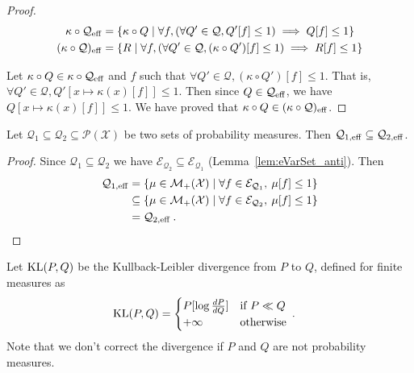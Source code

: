 \begin{proof}
  \begin{align*}
    \kappa \circ \mathcal{Q}_{\operatorname{eff}}
    &= \{\kappa \circ Q \mid \forall f, (\forall Q' \in \mathcal{Q}, Q'[f] \le 1) \implies Q[f] \le 1\}
    \\
    (\kappa \circ \mathcal{Q})_{\operatorname{eff}}
    &= \{R \mid \forall f, (\forall Q' \in \mathcal{Q}, (\kappa \circ Q')[f] \le 1) \implies R[f] \le 1\}
  \end{align*}

  Let $\kappa \circ Q \in \kappa \circ \mathcal{Q}_{\operatorname{eff}}$ and $f$ such that $\forall Q' \in \mathcal{Q}, (\kappa \circ Q')[f] \le 1$. That is, $\forall Q' \in \mathcal{Q}, Q'[x \mapsto \kappa(x)[f]] \le 1$.
  Then since $Q \in \mathcal{Q}_{\operatorname{eff}}$, we have $Q[x \mapsto \kappa(x)[f]] \le 1$.
  We have proved that $\kappa \circ Q \in (\kappa \circ \mathcal{Q})_{\operatorname{eff}}$.
\end{proof}


\begin{lemma}\label{lem:effectiveSet_mono}
Let $\mathcal{Q}_1 \subseteq \mathcal{Q}_2 \subseteq \mathcal{P}(\mathcal{X})$ be two sets of probability measures.
Then $\mathcal{Q}_{1, \operatorname{eff}} \subseteq \mathcal{Q}_{2, \operatorname{eff}}$.
\end{lemma}

\begin{proof}
Since $\mathcal{Q}_1 \subseteq \mathcal{Q}_2$ we have $\mathcal{E}_{\mathcal{Q}_2} \subseteq \mathcal{E}_{\mathcal{Q}_1}$ (Lemma~\ref{lem:eVarSet_anti}).
Then
\begin{align*}
  \mathcal{Q}_{1, \operatorname{eff}}
  &= \{\mu \in \mathcal{M}_+(\mathcal{X}) \mid \forall f \in \mathcal{E}_{\mathcal{Q}_1}, \: \mu[f] \le 1\}
  \\
  &\subseteq \{\mu \in \mathcal{M}_+(\mathcal{X}) \mid \forall f \in \mathcal{E}_{\mathcal{Q}_2}, \: \mu[f] \le 1\}
  \\
  &= \mathcal{Q}_{2, \operatorname{eff}}
  \: .
\end{align*}
\end{proof}

Let $\operatorname{KL}(P, Q)$ be the Kullback-Leibler divergence from $P$ to $Q$, defined for finite measures as
\begin{align*}
  \operatorname{KL}(P, Q)
  &= \begin{cases}
    P[\log \frac{dP}{dQ}] & \text{if } P \ll Q \\
    +\infty & \text{otherwise}
  \end{cases}
  \: .
\end{align*}
Note that we don't correct the divergence if $P$ and $Q$ are not probability measures.


